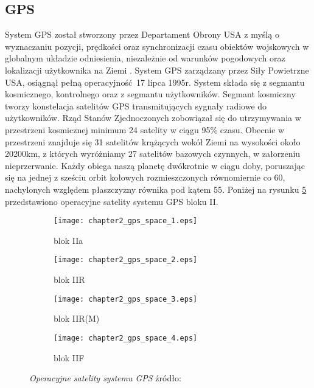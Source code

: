 	\subsection{GPS}
\noindent System GPS został stworzony przez Departament Obrony USA z myślą o wyznaczaniu pozycji, prędkości oraz synchronizacji czasu obiektów wojskowych
w globalnym układzie odniesienia, niezależnie od warunków pogodowych oraz lokalizacji użytkownika na Ziemi \cite[][strona 309]{hofmann_gnss}.
System GPS zarządzany przez Siły Powietrzne USA, osiągnął pełną operacyjność 17 lipca 1995r. System składa się z segmantu kosmicznego, kontrolnego oraz z segmantu użytkowników.
Segmant kosmiczny tworzy konstelacja satelitów GPS transmitujących sygnały radiowe do użytkowników. Rząd Stanów Zjednoczonych zobowiązał się do 
utrzymywania w przestrzeni kosmicznej minimum 24 satelity w ciągu 95\% czasu. Obecnie w przestrzeni znajduje się 31 satelitów krążących wokół Ziemi na 
wysokości około 20200km, z których wyróżniamy 27 satelitów bazowych czynnych, w załorzeniu nieprzerwanie. 
Każdy obiega naszą planetę dwókrotnie w ciągu doby, poruszając się na jednej z sześciu orbit kołowych rozmieszczonych równomiernie co 60\degree,
nachylonych względem płaszczyzny równika pod kątem 55\degree \cite[]{GPS_GOV}. Poniżej na rysunku \ref{fig:gps_space_segment} przedstawiono operacyjne satelity systemu GPS
bloku II.
\begin{figure}[H]
\centering
\begin{subfigure}{.2\textwidth}
  \centering
  \texttt{[image: chapter2\_gps\_space\_1.eps]}
  \caption{blok IIa}
  \label{fig:block2a}
\end{subfigure}%
\begin{subfigure}{.2\textwidth}
  \centering
  \texttt{[image: chapter2\_gps\_space\_2.eps]}
  \caption{blok IIR}
  \label{fig:block2r}
\end{subfigure}
\begin{subfigure}{.2\textwidth}
        \centering
        \texttt{[image: chapter2\_gps\_space\_3.eps]}
        \caption{blok IIR(M)}
        \label{fig:block2rm}
\end{subfigure}
\begin{subfigure}{.2\textwidth}
        \centering
        \texttt{[image: chapter2\_gps\_space\_4.eps]}
        \caption{blok IIF}
        \label{fig:block2f}
\end{subfigure}
\caption{\textit{Operacyjne satelity systemu GPS}
źródło: \cite[]{GPS_GOV}}
\label{fig:gps_space_segment}
\end{figure}
